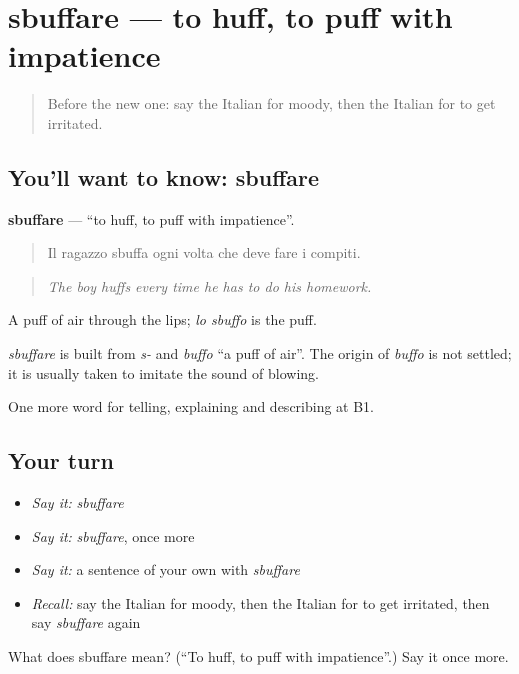 \section[sbuffare]{sbuffare — to huff, to puff with impatience}

\label{lesson:IT-C474-sbuffare}



\begin{quote}
Before the new one: say the Italian for moody, then the Italian for to get irritated.
\end{quote}

\subsection*{You'll want to know: sbuffare}
\textbf{sbuffare} — \textquotedblleft{}to huff, to puff with impatience\textquotedblright{}.

\begin{quote}
Il ragazzo sbuffa ogni volta che deve fare i compiti.
\end{quote}

\begin{quote}
\emph{The boy huffs every time he has to do his homework.}
\end{quote}

A puff of air through the lips; \emph{lo sbuffo} is the puff.

\begin{cousinweb}
\emph{sbuffare} is built from \emph{s-} and \emph{buffo} \textquotedblleft{}a puff of air\textquotedblright{}. The origin of \emph{buffo} is not settled; it is usually taken to imitate the sound of blowing.
\end{cousinweb}

\begin{grammarlens}[title={What you've built}]
One more word for telling, explaining and describing at B1.
\end{grammarlens}

\subsection*{Your turn}
\begin{itemize}
\raggedright
  \item \emph{Say it:} \emph{sbuffare}
  \item \emph{Say it:} \emph{sbuffare}, once more
  \item \emph{Say it:} a sentence of your own with \emph{sbuffare}
  \item \emph{Recall:} say the Italian for moody, then the Italian for to get irritated, then say \emph{sbuffare} again
\end{itemize}

\begin{tcolorbox}[breakable,colback=teal!4,colframe=teal!35!black,title={Before you move on}]
What does sbuffare mean? (\textquotedblleft{}To huff, to puff with impatience\textquotedblright{}.) Say it once more.
\end{tcolorbox}
